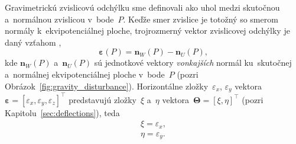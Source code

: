 \documentclass[a4paper, 12pt]{book}
\let\vec\mathbf
\begin{document}
Gravimetrickú zvislicovú odchýlku sme definovali ako uhol medzi skutočnou 
a~normálnou zvislicou v~bode~$P$.  Keďže smer zvislice je totožný so smerom 
normály k~ekvipotenciálnej ploche, trojrozmerný vektor zvislicovej odchýlky je 
daný vzťahom \parencite{SansoGeoidDetermination},
%
\begin{equation}
\label{eq:deflection_eps}
\boldsymbol\varepsilon(P) = \vec n_W(P) - \vec n_U(P){,}
\end{equation}
%
kde $\vec n_W(P)$ a~$\vec n_U(P)$ sú jednotkové vektory \emph{vonkajších} 
normál ku~skutočnej a~normálnej ekvipotenciálnej ploche v~bode~$P$ (pozri 
Obrázok~\ref{fig:gravity_disturbance}).  Horizontálne zložky~$\varepsilon_x$, 
$\varepsilon_y$ vektora~$\boldsymbol\varepsilon = [\varepsilon_x, 
\varepsilon_y, \varepsilon_z]^\top$ predstavujú zložky~$\xi$ a~$\eta$ 
vektora~$\boldsymbol\Theta = [\xi, \eta]^\top$ (pozri 
Kapitolu~\ref{sec:deflections}), teda
%
\begin{equation}
\label{eq:xi_eta_eps}
\begin{split}
\xi = \varepsilon_x{,}\\
\eta = \varepsilon_y{.}
\end{split}
\end{equation}
\end{document}
